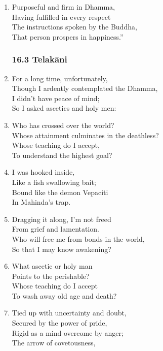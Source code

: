 \documentclass[10pt, openany]{book}
\newcommand*{\vleftofline}[1]{\leavevmode\llap{#1}}
\begin{document}
\begin{enumerate}
\item Purposeful and firm in Dhamma,\\
Having fulfilled in every respect\\
The instructions spoken by the Buddha,\\
That person prospers in happiness.”

\subsubsection*{16.3 Telakāni}

\item For a long time, unfortunately,\\
Though I ardently contemplated the Dhamma,\\
I didn’t have peace of mind;\\
So I asked ascetics and holy men:

\item \vleftofline{“}Who has crossed over the world?\\
Whose attainment culminates in the deathless?\\
Whose teaching do I accept,\\
To understand the highest goal?

\item I was hooked inside,\\
Like a fish swallowing bait;\\
Bound like the demon Vepaciti\\
In Mahinda’s trap.

\item Dragging it along, I’m not freed\\
From grief and lamentation.\\
Who will free me from bonds in the world,\\
So that I may know awakening?

\item What ascetic or holy man\\
Points to the perishable?\\
Whose teaching do I accept\\
To wash away old age and death?

\item Tied up with uncertainty and doubt,\\
Secured by the power of pride,\\
Rigid as a mind overcome by anger;\\
The arrow of covetousness,


\end{enumerate}
\end{document}
